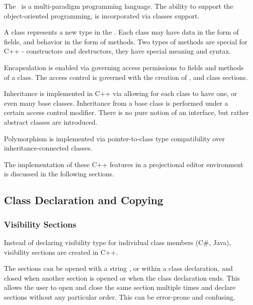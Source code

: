
The \cpppl\ is a multi-paradigm programming language. The ability to support the object-oriented programming,
is incorporated via classes support. 

A class represents a new type in the \cpppl. Each class may have data in the 
form of fields, and behavior in the form of methods. Two types of methods are special for
C++ - constructors and destructors, they have special meaning and syntax.

Encapsulation is enabled via governing access permissions to fields and methods of a class.
The access control is governed with the creation of ,  and 
class sections.

Inheritance is implemented in C++ via allowing for each class to have one, or even many base classes.
Inheritance from a base class is performed under a certain access control modifier. There is no pure notion 
of an interface, but rather abstract classes are introduced.

Polymorphism is implemented via pointer-to-class type compatibility over inheritance-connected classes.

The implementation of these C++ features in a projectional editor environment is discussed in the
following sections.


\subsection{Class Declaration and Copying}
\label{section:classes}




\subsubsection{Visibility Sections}
\label{visibilitysections}



\cppproblem

Instead of declaring visibility type for individual class members (C\#, Java), visibility sections are created
in C++. 

The sections can be opened with a string ,  or 
within a class declaration, and closed when another section is opened or when the class declaration
ends. This allows the user to open and close the same section multiple times and declare sections
without any particular order. This can be error-prone and confusing.

